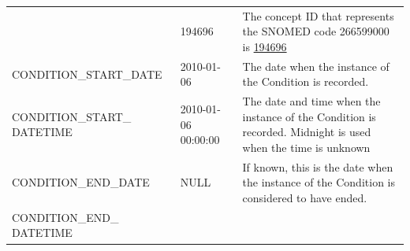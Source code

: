 \documentclass[11pt]{book}
\begin{document}
\begin{longtable}[]{@{}lll@{}}
\begin{minipage}[t]{0.31\columnwidth}
\end{minipage} & \begin{minipage}[t]{0.12\columnwidth}\raggedright\strut
194696\strut
\end{minipage} & \begin{minipage}[t]{0.48\columnwidth}\raggedright\strut
The concept ID that represents the SNOMED code 266599000 is
\href{http://athena.ohdsi.org/search-terms/terms/194696}{194696}\strut
\end{minipage}\tabularnewline
\begin{minipage}[t]{0.31\columnwidth}\raggedright\strut
CONDITION\_START\_DATE\strut
\end{minipage} & \begin{minipage}[t]{0.12\columnwidth}\raggedright\strut
2010-01-06\strut
\end{minipage} & \begin{minipage}[t]{0.48\columnwidth}\raggedright\strut
The date when the instance of the Condition is recorded.\strut
\end{minipage}\tabularnewline
\begin{minipage}[t]{0.31\columnwidth}\raggedright\strut
CONDITION\_START\_ DATETIME\strut
\end{minipage} & \begin{minipage}[t]{0.12\columnwidth}\raggedright\strut
2010-01-06 00:00:00\strut
\end{minipage} & \begin{minipage}[t]{0.48\columnwidth}\raggedright\strut
The date and time when the instance of the Condition is recorded.
Midnight is used when the time is unknown\strut
\end{minipage}\tabularnewline
\begin{minipage}[t]{0.31\columnwidth}\raggedright\strut
CONDITION\_END\_DATE\strut
\end{minipage} & \begin{minipage}[t]{0.12\columnwidth}\raggedright\strut
NULL\strut
\end{minipage} & \begin{minipage}[t]{0.48\columnwidth}\raggedright\strut
If known, this is the date when the instance of the Condition is
considered to have ended.\strut
\end{minipage}\tabularnewline
\begin{minipage}[t]{0.31\columnwidth}\raggedright\strut
CONDITION\_END\_ DATETIME\strut
\end{minipage} & \begin{minipage}[t]{0.12\columnwidth}\raggedright\strut

\end{minipage}
\end{longtable}
\end{document}
